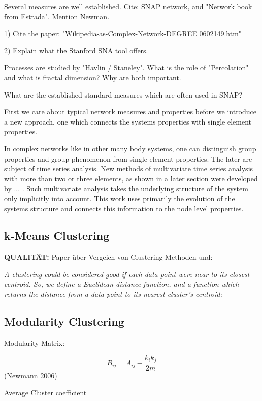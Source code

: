 \documentclass[a4paper,10pt]{scrbook}
\begin{document}
Several measures are well established. Cite: SNAP network, and "Network book from Estrada". Mention Newman. 

1) Cite the paper: "Wikipedia-as-Complex-Network-DEGREE 0602149.htm" \cite{Zlatic2006}
 
2) Explain what the Stanford SNA tool offers.

Processes are studied by "Havlin / Staneley". What is the role of "Percolation" and what is fractal dimension? Why are both important.

What are the established standard measures which are often used in SNAP?


First we care about typical network measures and properties before we introduce a new approach, one which connects the systems properties with single element properties.

In complex networks like in other many body systems, one can distinguish group properties and group phenomenon from single element properties. The later are subject of time series analysis. New methods of multivariate time series analysis with more than two or three elements, as shown in a later section were developed by ... . Such multivariate analysis takes the underlying structure of the system only implicitly into account. This work uses primarily the evolution of the systems structure and connects this information to the node level properties. 

\subsection{k-Means Clustering}

\textbf{QUALITÄT:}  Paper über Vergeich von Clustering-Methoden und:

\textit{A clustering could be considered good if each data point were near to its closest centroid. So, we define a Euclidean distance function, and a function which returns the distance from a data point to its nearest cluster’s centroid:}

\subsection{Modularity Clustering}
Modularity Matrix:

\begin{equation}
B_{ij} = A_{ij} - \frac{k_ik_j}{2m}
\end{equation}
(Newmann 2006) 


Average Cluster coefficient
\end{document}
